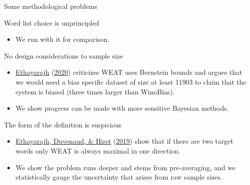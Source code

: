 \documentclass[
  10pt,
  ignorenonframetext,
  x11names, dvipsnames, bibspacing,natbib, table]{beamer}
\providecommand{\tightlist}{%
  \setlength{\itemsep}{0pt}\setlength{\parskip}{0pt}}
\begin{document}
\begin{frame}{Some methodological problems}
\protect\hypertarget{some-methodological-problems}{}
\begin{block}{Word list choice is unprincipled}
\protect\hypertarget{word-list-choice-is-unprincipled}{}
\begin{itemize}
\tightlist
\item
  We run with it for comparison.
\end{itemize}

\pause
\end{block}

\begin{block}{No design considerations to sample size}
\protect\hypertarget{no-design-considerations-to-sample-size}{}
\begin{itemize}
\tightlist
\item
  \protect\hyperlink{ref-Ethayarajh2020measuring}{Ethayarajh}
  (\protect\hyperlink{ref-Ethayarajh2020measuring}{2020}) criticizes
  WEAT uses Bernstein bounds and argues that we would need a bias
  specific dataset of size at least 11903 to claim that the system is
  biased (three times larger than WinoBias).
\end{itemize}

\pause

\begin{itemize}
\tightlist
\item
  We show progress can be made with more sensitive Bayesian methods.
\end{itemize}
\end{block}

\begin{block}{The form of the definition is suspicious}
\protect\hypertarget{the-form-of-the-definition-is-suspicious}{}
\begin{itemize}
\tightlist
\item
  \protect\hyperlink{ref-Ethayarajh2019understanding}{Ethayarajh,
  Duvenaud, \& Hirst}
  (\protect\hyperlink{ref-Ethayarajh2019understanding}{2019}) show that
  if there are two target words only WEAT is always maximal in one
  direction.
\end{itemize}

\pause

\begin{itemize}
\tightlist
\item
  We show the problem runs deeper and stems from pre-averaging, and we
  statistically gauge the uncertainty that arises from raw sample sizes.
\end{itemize}
\end{block}
\end{frame}
\end{document}
